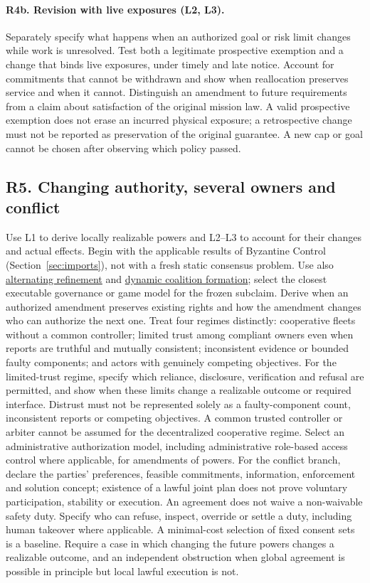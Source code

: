 \documentclass[11pt]{article}
\begin{document}
\paragraph{R4b. Revision with live exposures (L2, L3).} Separately specify what happens when an authorized goal or risk limit changes while work is unresolved. Test both a legitimate prospective exemption and a change that binds live exposures, under timely and late notice. Account for commitments that cannot be withdrawn and show when reallocation preserves service and when it cannot. Distinguish an amendment to future requirements from a claim about satisfaction of the original mission law. A valid prospective exemption does not erase an incurred physical exposure; a retrospective change must not be reported as preservation of the original guarantee. A new cap or goal cannot be chosen after observing which policy passed.

\subsection*{R5. Changing authority, several owners and conflict}
Use L1 to derive locally realizable powers and L2--L3 to account for their changes and actual effects. Begin with the applicable results of Byzantine Control (Section~\ref{sec:imports}), not with a fresh static consensus problem. Use also \href{https://doi.org/10.1007/BFb0055622}{alternating refinement} and \href{https://pages.nyu.edu/debraj/Papers/KonishiRay.pdf}{dynamic coalition formation}; select the closest executable governance or game model for the frozen subclaim. Derive when an authorized amendment preserves existing rights and how the amendment changes who can authorize the next one. Treat four regimes distinctly: cooperative fleets without a common controller; limited trust among compliant owners even when reports are truthful and mutually consistent; inconsistent evidence or bounded faulty components; and actors with genuinely competing objectives. For the limited-trust regime, specify which reliance, disclosure, verification and refusal are permitted, and show when these limits change a realizable outcome or required interface. Distrust must not be represented solely as a faulty-component count, inconsistent reports or competing objectives. A common trusted controller or arbiter cannot be assumed for the decentralized cooperative regime. Select an administrative authorization model, including administrative role-based access control where applicable, for amendments of powers. For the conflict branch, declare the parties' preferences, feasible commitments, information, enforcement and solution concept; existence of a lawful joint plan does not prove voluntary participation, stability or execution. An agreement does not waive a non-waivable safety duty. Specify who can refuse, inspect, override or settle a duty, including human takeover where applicable. A minimal-cost selection of fixed consent sets is a baseline. Require a case in which changing the future powers changes a realizable outcome, and an independent obstruction when global agreement is possible in principle but local lawful execution is not.
\end{document}
